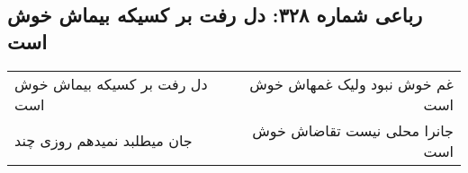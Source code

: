 \begin{center}
\section*{رباعی شماره ۳۲۸: دل رفت بر کسیکه بیماش خوش است}
\label{sec:0328}
\begin{longtable}{l p{0.5cm} r}
دل رفت بر کسیکه بیماش خوش است
&&
غم خوش نبود ولیک غمهاش خوش است
\\
جان میطلبد نمیدهم روزی چند
&&
جانرا محلی نیست تقاضاش خوش است
\\
\end{longtable}
\end{center}
